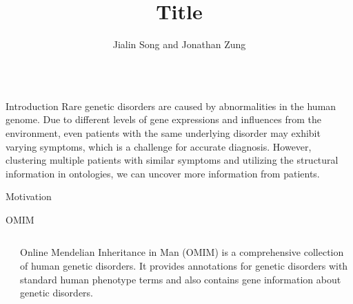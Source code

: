 \documentclass[final]{beamer} %
\title[]{{\fontsize{240}{240}\selectfont Title}}
\author[]{Jialin Song and Jonathan Zung}
\institute[University of Toronto]{Computational Biology Lab, University of Toronto}
\begin{document}
  \begin{frame}{}
  \maketitle
    \begin{columns}[T]
      \begin{column}{0.3\linewidth}
    \begin{block}{\Huge Introduction}
    \Large
    Rare genetic disorders are caused by abnormalities in the human genome. Due to different levels of gene expressions and influences from the environment, even patients with the same underlying disorder may exhibit varying symptoms, which is a challenge for accurate diagnosis. However, clustering multiple patients with similar symptoms and utilizing the structural information in ontologies, we can uncover more information from patients.
   \vspace{3cm}

    \end{block}
    
    \begin{block}{\Huge Motivation}
    
    \begin{block}{\Large OMIM}
      \begin{columns}[T]
        \begin{column}{.5\textwidth}
        \end{column}
        
        \begin{column}{.5\textwidth}
        \Large
        Online Mendelian Inheritance in Man (OMIM) is a comprehensive collection of human genetic disorders. It provides annotations for genetic disorders with standard human phenotype terms and also contains gene information about genetic disorders.
       \end{column}
    \end{columns}
    \end{block}


\end{block}
\end{column}
\end{columns}
\end{frame}
\end{document}
